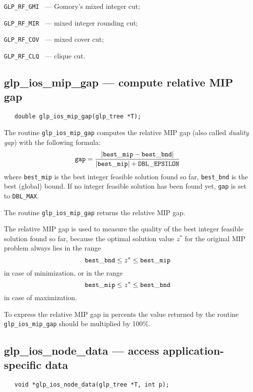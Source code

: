 \verb|GLP_RF_GMI | --- Gomory's mixed integer cut;

\verb|GLP_RF_MIR | --- mixed integer rounding cut;

\verb|GLP_RF_COV | --- mixed cover cut;

\verb|GLP_RF_CLQ | --- clique cut.

\subsection{glp\_ios\_mip\_gap --- compute relative MIP gap}

\synopsis

\begin{verbatim}
   double glp_ios_mip_gap(glp_tree *T);
\end{verbatim}

\description

The routine \verb|glp_ios_mip_gap| computes the relative MIP gap (also
called {\it duality gap}) with the following formula:
$${\tt gap} = \frac{|{\tt best\_mip} - {\tt best\_bnd}|}
{|{\tt best\_mip}| + {\tt DBL\_EPSILON}}$$
where \verb|best_mip| is the best integer feasible solution found so
far, \verb|best_bnd| is the best (global) bound. If no integer feasible
solution has been found yet, \verb|gap| is set to \verb|DBL_MAX|.

\newpage

\returns

The routine \verb|glp_ios_mip_gap| returns the relative MIP gap.


The relative MIP gap is used to measure the quality of the best integer
feasible solution found so far, because the optimal solution value
$z^*$ for the original MIP problem always lies in the range
$${\tt best\_bnd}\leq z^*\leq{\tt best\_mip}$$
in case of minimization, or in the range
$${\tt best\_mip}\leq z^*\leq{\tt best\_bnd}$$
in case of maximization.

To express the relative MIP gap in percents the value returned by the
routine \verb|glp_ios_mip_gap| should be multiplied by 100\%.

\subsection{glp\_ios\_node\_data --- access application-specific data}

\synopsis

\begin{verbatim}
   void *glp_ios_node_data(glp_tree *T, int p);
\end{verbatim}


